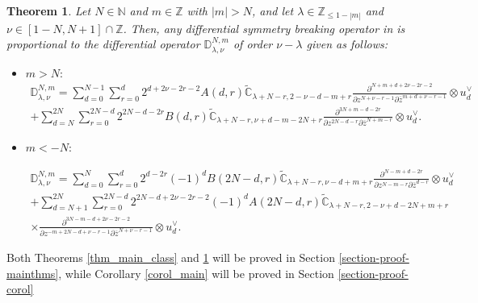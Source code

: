 \documentclass[12pt, pdflatex, a4paper]{article}
\theoremstyle{plain}
\newtheorem{thm}{Theorem}[section]
\theoremstyle{definition}
\def\C{{\mathbb C}}
\def\D{\mathbb{D}}
\def\N{{\mathbb N}}
\def\Z{{\mathbb Z}}
\begin{document}
\begin{thm}\label{thm_main_const} Let $N \in \N$ and $m \in \Z$ with $|m| > N$, and let $\lambda \in \Z_{\leq 1-|m|}$ and $\nu \in [1-N, N+1]\cap\Z$. Then, any differential symmetry breaking operator in {\normalfont{(\ref{DSBO-space})}} is proportional to the differential operator $\D_{\lambda, \nu}^{N, m}$ of order $\nu-\lambda$ given as follows:
\begin{itemize}[leftmargin=0.5cm]
\item[\normalfont{$\bullet$}] $m > N:$
\begin{multline}\label{Operator+}
\D_{\lambda, \nu}^{N,m} = \sum_{d=0}^{N-1}\sum_{r=0}^d 2^{d+2\nu-2r-2}A(d, r)\widetilde{\C}_{\lambda+N-r, 2-\nu-d-m+r}\frac{\partial^{N+m+d+2\nu-2r-2}}{\partial z^{N+\nu-r-1} \partial \overline{z}^{m+d+\nu-r-1}}\otimes u^\vee_{d}\\
 + \sum_{d=N}^{2N}\sum_{r=0}^{2N-d}2^{2N-d-2r}B(d,r)\widetilde{\C}_{\lambda+N-r, \nu+d-m-2N+r}\frac{\partial^{3N+m-d-2r}}{\partial z^{2N-d-r}\partial \overline{z}^{N+m-r}} \otimes u^\vee_d.
\end{multline}
\item[\normalfont{$\bullet$}] $m < -N:$


\begin{multline}\label{Operator-}
\D_{\lambda, \nu}^{N,m} = \sum_{d=0}^{N}\sum_{r=0}^{d}2^{d-2r}(-1)^dB(2N-d,r)\widetilde{\C}_{\lambda+N-r, \nu-d+m+r}\frac{\partial^{N-m+d-2r}}{\partial z^{N-m-r}\partial \overline{z}^{d-r}} \otimes u^\vee_{d}\\
+ \sum_{d=N+1}^{2N}\sum_{r=0}^{2N-d} 2^{2N-d+2\nu-2r-2}(-1)^d A(2N-d, r)\widetilde{\C}_{\lambda+N-r, 2-\nu+d-2N+m+r}\\
\times\frac{\partial^{3N-m-d+2\nu-2r-2}}{\partial z^{-m+2N-d+\nu-r-1} \partial \overline{z}^{N+\nu-r-1}}\otimes u^\vee_{d}.
\end{multline}
\end{itemize}
\end{thm}
Both Theorems \ref{thm_main_class} and \ref{thm_main_const} will be proved in Section \ref{section-proof-mainthms}, while Corollary \ref{corol_main} will be proved in Section \ref{section-proof-corol} 
\end{document}
